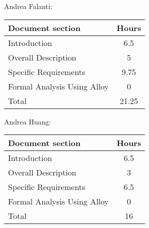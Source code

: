 Andrea Falanti:

\begin{tabular}{|l|c|}
    \hline
    Document section & Hours \\
    \hline
     Introduction & 6.5\\
     Overall Description & 5\\
     Specific Requirements & 9.75\\
     Formal Analysis Using Alloy & 0\\
     \hline
     Total & 21.25\\
     \hline
\end{tabular}
\vskip 0.3in

Andrea Huang:

\begin{tabular}{|l|c|}
    \hline
    Document section & Hours \\
    \hline
     Introduction &  6.5\\
     Overall Description & 3\\
     Specific Requirements & 6.5\\
     Formal Analysis Using Alloy & 0\\
     \hline
     Total & 16\\
     \hline
\end{tabular}